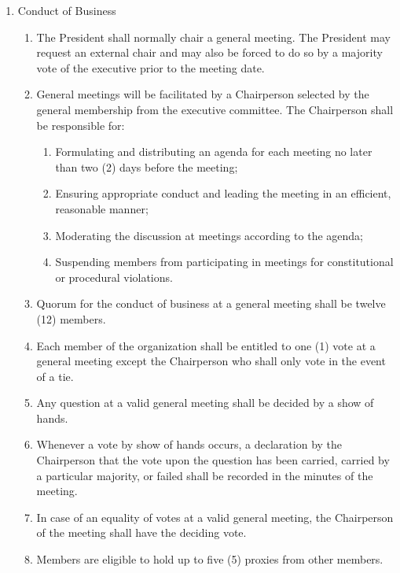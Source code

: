 \documentclass[12pt,a4paper]{article}
\begin{document}
\begin{enumerate}
\item Conduct of Business

\begin{enumerate}
\item The President shall normally chair a general meeting. The President may request an external chair and may also be forced to do so by a majority vote of the executive prior to the meeting date.  

\item General meetings will be facilitated by a Chairperson selected by the general membership from the executive committee.
The Chairperson shall be responsible for:

\begin{enumerate}
\item Formulating and distributing an agenda for each meeting no later than two (2) days before the meeting;

\item Ensuring appropriate conduct and leading the meeting in an efficient, reasonable manner;

\item Moderating the discussion at meetings according to the agenda;

\item Suspending members from participating in meetings for constitutional or procedural violations.
\end{enumerate}

\item Quorum for the conduct of business at a general meeting shall be twelve (12) members.

\item Each member of the organization shall be entitled to one (1) vote at a general meeting except the
Chairperson who shall only vote in the event of a tie.

\item Any question at a valid general meeting shall be decided by a show of hands.

\item Whenever a vote by show of hands occurs, a declaration by the Chairperson that the vote upon the question has been carried, carried by a particular majority, or failed shall be recorded in the minutes of the meeting.

\item In case of an equality of votes at a valid general meeting, the Chairperson of the meeting shall have the deciding vote.

\item Members are eligible to hold up to five (5) proxies from other members. 


\end{enumerate}
\end{enumerate}
\end{document}
